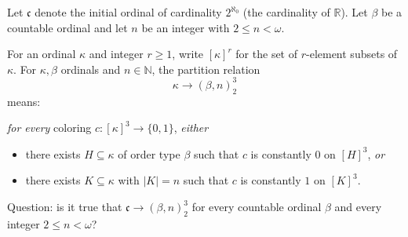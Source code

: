 Let $\mathfrak c$ denote the initial ordinal of cardinality $2^{\aleph_0}$ (the cardinality of $\mathbb R$). Let $\beta$ be a countable ordinal and let $n$ be an integer with $2\le n<\omega$.

For an ordinal $\kappa$ and integer $r\ge 1$, write $[\kappa]^r$ for the set of $r$-element subsets of $\kappa$.
For $\kappa,\beta$ ordinals and $n\in\mathbb N$, the partition relation
\[\kappa\to(\beta,n)_2^3\]
means:

\emph{for every} coloring $c:[\kappa]^3\to\{0,1\}$, \emph{either}
\begin{itemize}
\item there exists $H\subseteq\kappa$ of order type $\beta$ such that $c$ is constantly $0$ on $[H]^3$, \emph{or}
\item there exists $K\subseteq\kappa$ with $|K|=n$ such that $c$ is constantly $1$ on $[K]^3$.
\end{itemize}

Question: is it true that $\mathfrak c\to(\beta,n)_2^3$ for every countable ordinal $\beta$ and every integer $2\le n<\omega$?
